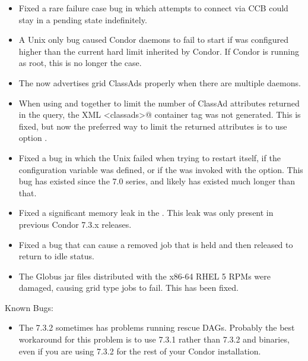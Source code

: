 \begin{itemize}
\item Fixed a rare failure case bug in which attempts to connect via
CCB could stay in a pending state indefinitely.

\item A Unix only bug caused Condor daemons to fail to start if
 was configured higher
than the current hard limit inherited by Condor.  If Condor is running
as root, this is no longer the case.

\item The  now advertises grid ClassAds properly when there
are multiple  daemons.

\item When using   and  together to
limit the number of ClassAd attributes returned in the query, the XML
\verb@<classads>@ container tag was not generated.  This is fixed, but
now the preferred way to limit the returned attributes is to
use  option .

\item Fixed a bug in which the Unix  failed
when trying to restart itself,
if the configuration variable  was defined,
or if the  was invoked with the  option.
This bug has existed since the 7.0 series,
and likely has existed much longer than that.

\item Fixed a significant memory leak in the . This
leak was only present in previous Condor 7.3.x releases.

\item Fixed a bug that can cause a removed job that is held and then
released to return to idle status.

\item The Globus jar files distributed with the x86-64 RHEL 5 RPMs were
damaged, causing  grid type jobs to fail. This has been fixed.

\end{itemize}

\noindent Known Bugs:

\begin{itemize}

\item The 7.3.2  sometimes has problems running
rescue DAGs.  Probably the best workaround for this problem is to use
7.3.1 rather than 7.3.2  and 
binaries, even if you are using 7.3.2 for the rest of your Condor
installation.

\end{itemize}

